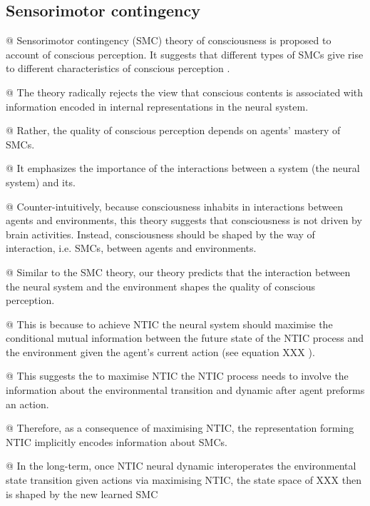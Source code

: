 \documentclass[utf8]{article}
\newenvironment{ants}
			{
			 \begin{easylist}[itemize]		
		 	}
			{
			\end{easylist}
			}
\newcommand{\critical}[1]{%
			\todo[color=OrangeRed!70!white]{#1}
		}
\begin{document}
		\subsection{Sensorimotor contingency}
			\begin{ants}
				
				@ Sensorimotor contingency (SMC) theory of consciousness is proposed to account of conscious perception. It suggests that different types of SMCs give rise to different characteristics of conscious perception \cite{o2001sensorimotor}. 
				
				@ The theory radically rejects the view that conscious contents is associated with information encoded in internal representations in the neural system. 

				@ Rather, the quality of conscious perception depends on agents' mastery of SMCs. 
				
				@ It emphasizes the importance of the interactions between a system (the neural system) and its. 
				
				@ Counter-intuitively, because consciousness inhabits in interactions between agents and environments, this theory suggests that consciousness is not driven by brain activities. Instead, consciousness should be shaped by the way of interaction, i.e. SMCs, between agents and environments. 
														

				
				
				@ Similar to the SMC theory, our theory predicts that the interaction between the neural system and the environment shapes the quality of conscious perception. 
				
				@ This is because to achieve NTIC the neural system should maximise the conditional mutual information between the future state of the NTIC process and the environment given the agent's current action (see equation XXX \critical{I NEED A EQUATION!}).
				
				@ This suggests the to maximise NTIC the NTIC process needs to involve the information about the environmental transition and dynamic after agent preforms an action. 
				
				
				@ Therefore, as a consequence of maximising NTIC, the representation forming NTIC implicitly encodes information about SMCs. 
				
				@ In the long-term, once NTIC neural dynamic interoperates the environmental state transition given actions via maximising NTIC, the state space of XXX then is shaped by the new learned SMC
				

\end{ants}
\end{document}
